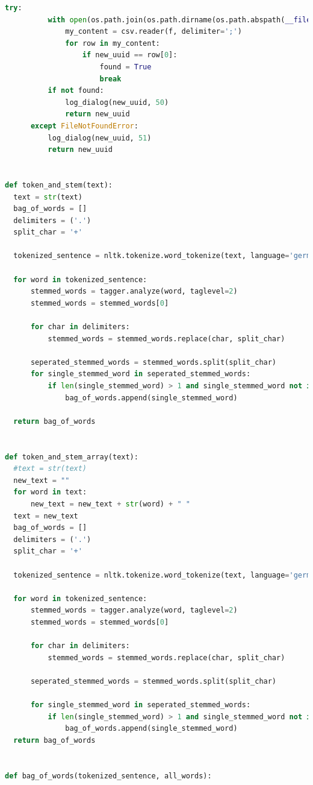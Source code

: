 \documentclass[12pt,oneside,titlepage,listof=totoc,bibliography=totoc]{scrartcl}
\begin{document}
\begin{appendices}
\begin{lstlisting}[language=python]
      try:
          with open(os.path.join(os.path.dirname(os.path.abspath(__file__)), DIALOG_LOG_FILE), 'r') as f:
              my_content = csv.reader(f, delimiter=';')
              for row in my_content:
                  if new_uuid == row[0]:
                      found = True
                      break
          if not found:
              log_dialog(new_uuid, 50)
              return new_uuid
      except FileNotFoundError:	
          log_dialog(new_uuid, 51)	
          return new_uuid


def token_and_stem(text):
  text = str(text)
  bag_of_words = []
  delimiters = ('.')
  split_char = '+'

  tokenized_sentence = nltk.tokenize.word_tokenize(text, language='german')

  for word in tokenized_sentence:
      stemmed_words = tagger.analyze(word, taglevel=2)
      stemmed_words = stemmed_words[0]

      for char in delimiters:
          stemmed_words = stemmed_words.replace(char, split_char)

      seperated_stemmed_words = stemmed_words.split(split_char)
      for single_stemmed_word in seperated_stemmed_words:
          if len(single_stemmed_word) > 1 and single_stemmed_word not in bag_of_words:
              bag_of_words.append(single_stemmed_word)

  return bag_of_words


def token_and_stem_array(text):
  #text = str(text)
  new_text = ""
  for word in text:
      new_text = new_text + str(word) + " "
  text = new_text
  bag_of_words = []
  delimiters = ('.')
  split_char = '+'

  tokenized_sentence = nltk.tokenize.word_tokenize(text, language='german')

  for word in tokenized_sentence:
      stemmed_words = tagger.analyze(word, taglevel=2)
      stemmed_words = stemmed_words[0]

      for char in delimiters:
          stemmed_words = stemmed_words.replace(char, split_char)

      seperated_stemmed_words = stemmed_words.split(split_char)

      for single_stemmed_word in seperated_stemmed_words:
          if len(single_stemmed_word) > 1 and single_stemmed_word not in bag_of_words:
              bag_of_words.append(single_stemmed_word)
  return bag_of_words


def bag_of_words(tokenized_sentence, all_words):


\end{lstlisting}
\end{appendices}
\end{document}
